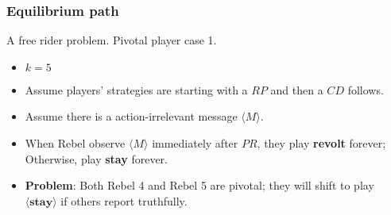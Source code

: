 \documentclass[10pt]{beamer}
\begin{document}
\begin{frame}
\frametitle{Equilibrium path}

A free rider problem. Pivotal player case 1.

\begin{itemize}
\item $k=5$
\item Assume players' strategies are starting with a $RP$ and then a $CD$ follows. 
\item Assume there is a action-irrelevant message $\langle M \rangle$.
\item When Rebel observe $\langle M \rangle$ immediately after $PR$, they play \textbf{revolt} forever; Otherwise, play \textbf{stay} forever.

\end{itemize}

\begin{center}
\end{center}

\begin{itemize}
\item \textbf{Problem}: Both Rebel 4 and Rebel 5 are pivotal; they will shift to play $\langle \textbf{stay} \rangle$ if others report truthfully.
\end{itemize}


\end{frame}
\end{document}

